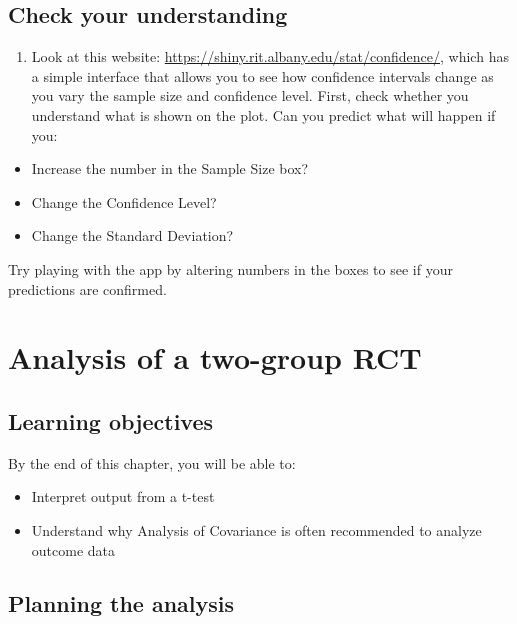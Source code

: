 \documentclass{krantz}
\providecommand{\tightlist}{%
\setlength{\itemsep}{0pt}\setlength{\parskip}{0pt}}
\begin{document}
\hypertarget{check-your-understanding-10}{%
\section{Check your understanding}\label{check-your-understanding-10}}

\begin{enumerate}
\def\labelenumi{\arabic{enumi}.}
\tightlist
\item
  Look at this website: \url{https://shiny.rit.albany.edu/stat/confidence/}, which has a simple interface that allows you to see how confidence intervals change as you vary the sample size and confidence level. First, check whether you understand what is shown on the plot. Can you predict what will happen if you:
\end{enumerate}

\begin{itemize}
\tightlist
\item
  Increase the number in the Sample Size box?\\
\item
  Change the Confidence Level?\\
\item
  Change the Standard Deviation?
\end{itemize}

Try playing with the app by altering numbers in the boxes to see if your predictions are confirmed.

\hypertarget{analysis}{%
\chapter{Analysis of a two-group RCT}\label{analysis}}

\hypertarget{learning-objectives-10}{%
\section{Learning objectives}\label{learning-objectives-10}}

By the end of this chapter, you will be able to:

\begin{itemize}
\tightlist
\item
  Interpret output from a t-test
\item
  Understand why Analysis of Covariance is often recommended to analyze outcome data
\end{itemize}

\hypertarget{planning-the-analysis}{%
\section{Planning the analysis}\label{planning-the-analysis}}
\end{document}
